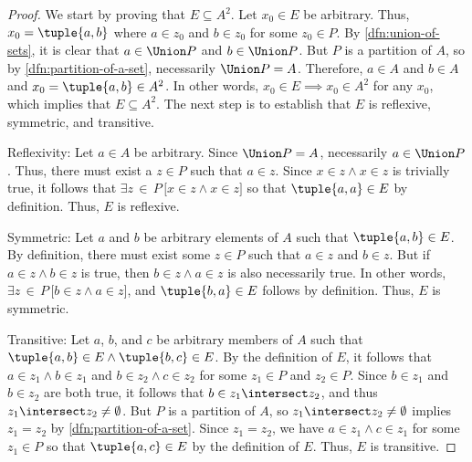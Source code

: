 \begin{proof}
    We start by proving that \( E \subseteq A^{2} \). Let \( x_{0} \in E \) be arbitrary. Thus,
    \( x_{0} = \tuple{a,b} \) where \( a \in z_{0} \) and \( b \in z_{0} \) for some \( z_{0} \in P \).
    By \cref{dfn:union-of-sets}, it is clear that \( a \in \Union P \) and \( b \in \Union P \). But
    \( P \) is a partition of \( A \), so by \cref{dfn:partition-of-a-set}, necessarily \( \Union P = A \).
    Therefore, \( a \in A \) and \( b \in A \) and \( x_{0} = \tuple{a,b} \in A^{2} \). In other words,
    \( x_{0} \in E \implies x_{0} \in A^{2} \) for any \( x_{0} \), which implies that \( E \subseteq A^{2} \).
    The next step is to establish that \( E \) is reflexive, symmetric, and transitive.

    \vspace{0.3cm}
    \noindent
    Reflexivity: Let \( a \in A \) be arbitrary. Since \( \Union P = A \), necessarily \( a \in \Union P \).
    Thus, there must exist a \( z \in P \) such that \( a \in z \). Since \( x \in z \land x \in z \) is
    trivially true, it follows that \( \exists z\,{\in}\,P \, \big[ x \in z \land x \in z \big] \) so that
    \( \tuple{a,a} \in E \) by definition. Thus, \( E \) is reflexive.

    \vspace{0.3cm}
    \noindent
    Symmetric: Let \( a \) and \( b \) be arbitrary elements of \( A \) such that \( \tuple{a,b} \in E \).
    By definition, there must exist some \( z \in P \) such that \( a \in z \) and \( b \in z \).
    But if \( a \in z \land b \in z \) is true, then \( b \in z \land a \in z \) is also necessarily true.
    In other words, \( \exists z\,{\in}\,P \, \big[ b \in z \land a \in z \big] \), and \( \tuple{b,a} \in E \)
    follows by definition. Thus, \( E \) is symmetric.

    \vspace{0.3cm}
    \noindent
    Transitive: Let \( a \), \( b \), and \( c \) be arbitrary members of \( A \) such that \( \tuple{a,b} \in E
    \land \tuple{b,c} \in E \). By the definition of \( E \), it follows that \( a \in z_{1} \land b \in z_{1}\)
    and \( b \in z_{2} \land c \in z_{2} \) for some \( z_{1} \in P \) and \( z_{2} \in P \). Since \( b \in z_{1}\)
    and \( b \in z_{2} \) are both true, it follows that \( b \in z_{1} \intersect z_{2} \), and thus
    \( z_{1} \intersect z_{2} \neq \emptyset \). But \( P \) is a partition of \( A \), so
    \( z_{1} \intersect z_{2} \neq \emptyset \) implies \( z_{1} = z_{2} \) by \cref{dfn:partition-of-a-set}.
    Since \( z_{1} = z_{2} \), we have \( a \in z_{1} \land c \in z_{1} \) for some \( z_{1} \in P \) so that
    \( \tuple{a,c} \in E \) by the definition of \( E \). Thus, \( E \) is transitive.


\end{proof}
